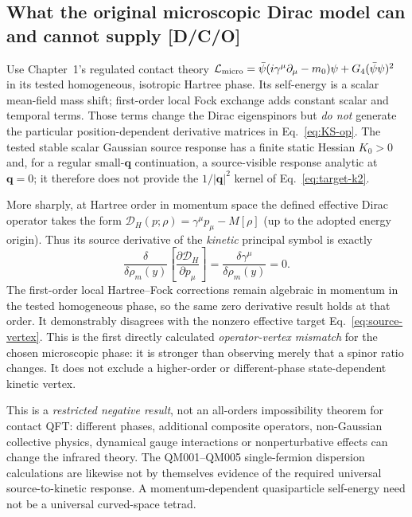 \documentclass[11pt,a4paper]{article}
\begin{document}
\subsection{What the original microscopic Dirac model can and cannot supply [D/C/O]}
Use Chapter~1's regulated contact theory $\mathcal L_{\rm micro}=\bar\psi(i\gamma^\mu\partial_\mu-m_0)\psi+G_4(\bar\psi\psi)^2$ in its tested homogeneous, isotropic Hartree phase. Its self-energy is a scalar mean-field mass shift; first-order local Fock exchange adds constant scalar and temporal terms. Those terms change the Dirac eigenspinors but \emph{do not} generate the particular position-dependent derivative matrices in Eq.~\eqref{eq:KS-op}. The tested stable scalar Gaussian source response has a finite static Hessian $K_0>0$ and, for a regular small-$\bm q$ continuation, a source-visible response analytic at $\bm q=0$; it therefore does not provide the $1/|\bm q|^2$ kernel of Eq.~\eqref{eq:target-k2}.

More sharply, at Hartree order in momentum space the defined effective Dirac operator takes the form $\mathcal D_H(p;\rho)=\gamma^\mu p_\mu-M[\rho]$ (up to the adopted energy origin). Thus its source derivative of the \emph{kinetic} principal symbol is exactly
\begin{equation}\label{eq:Hartree-mismatch}
 \boxed{\frac{\delta}{\delta\rho_m(y)}\left[\frac{\partial\mathcal D_H}{\partial p_\mu}\right]=\frac{\delta\gamma^\mu}{\delta\rho_m(y)}=0.}
\end{equation}
The first-order local Hartree--Fock corrections remain algebraic in momentum in the tested homogeneous phase, so the same zero derivative result holds at that order. It demonstrably disagrees with the nonzero effective target Eq.~\eqref{eq:source-vertex}. This is the first directly calculated \emph{operator-vertex mismatch} for the chosen microscopic phase: it is stronger than observing merely that a spinor ratio changes. It does not exclude a higher-order or different-phase state-dependent kinetic vertex.

This is a \emph{restricted negative result}, not an all-orders impossibility theorem for contact QFT: different phases, additional composite operators, non-Gaussian collective physics, dynamical gauge interactions or nonperturbative effects can change the infrared theory. The QM001--QM005 single-fermion dispersion calculations are likewise not by themselves evidence of the required universal source-to-kinetic response. A momentum-dependent quasiparticle self-energy need not be a universal curved-space tetrad.
\end{document}
